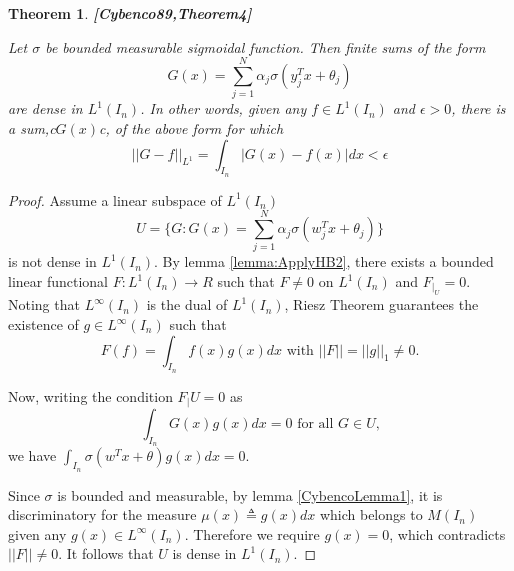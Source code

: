 \documentclass[12pt]{amsart}
\theoremstyle{plain}
\newtheorem{thm}{Theorem}[section]
\theoremstyle{definition}
\theoremstyle{remark}
\numberwithin{equation}{section}
\numberwithin{thm}{section}
\begin{document}
\begin{thm}
\textbf{[Cybenco89,Theorem4]} 

Let $\sigma$ be bounded measurable sigmoidal function. Then finite sums of the form 
\begin{equation}
    G(x)=\sum_{j=1}^N \alpha_{j} \sigma(y_j^T x + \theta_j)
\end{equation}
are dense in $L^1(I_n)$. In other words, given any $f \in L^1(I_n)$ and $\epsilon > 0$, there is a sum,c$G(x)$c, of the above form for which 
\begin{equation*}
    ||G-f||_{L^1} = \int _{I_n} | G(x)-f(x)| dx < \epsilon
\end{equation*}
\end{thm}
\begin{proof}
     Assume a linear subspace of $L^1(I_n)$   
        \begin{equation*}        
        U=\{ G : G(x)=\sum^N_{j=1} \alpha_j \sigma(w_j^Tx+\theta_j) \} 
        \end{equation*}
        is not dense in $L^1(I_n)$. By lemma \ref{lemma:ApplyHB2}, there exists a bounded linear functional $F:L^1(I_n) \to R$ such that $F \neq 0$ on $L^1(I_n)$ and $F_|_U=0$. Noting that $L^\infty(I_n)$ is the dual of $L^1(I_n)$, Riesz Theorem guarantees the existence of $g \in L^\infty(I_n)$ such that 
        \begin{equation*}
            F(f)=\int_{I_n}f(x)g(x)dx \text{ with } ||F|| = ||g||_1 \neq 0 \text{.}
        \end{equation*}
  
        Now, writing the condition $F_|U=0$ as
        \begin{equation*}
            \int_{I_n} G(x)g(x)dx=0 \text{ for all } G \in U \text{,}
        \end{equation*}
    we have $\int_{I_n} \sigma(w^Tx+\theta)g(x)dx=0$.
    
   Since $\sigma$ is bounded and measurable, by lemma \ref{CybencoLemma1}, it is discriminatory for the measure $\mu(x) \triangleq g(x)dx$ which belongs to $M(I_n)$ given any $g(x) \in L^\infty(I_n)$. Therefore we require $g(x)=0$, which contradicts $||F|| \neq 0$. It follows that $U$ is dense in $L^1(I_n)$.   

\end{proof}
\end{document}
